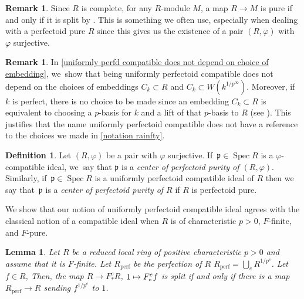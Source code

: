 \documentclass[JEP,XML,SOM,Unicode,published]{cedram}
\let\autoref\cref
\newcommand\mto{\mathchoice{\longmapsto}{\mapsto}{\mapsto}{\mapsto}}
\theoremstyle{plain}
\newtheorem{lemma}[theorem]{Lemma}
\theoremstyle{definition}
\newtheorem{definition}[theorem]{Definition}
\newtheorem{remark}[theorem]{Remark}
\numberwithin{equation}{theorem}
\newcommand{\p}{\mathfrak{p}}
\newcommand{\perf}{_{\mathrm{perf}}}
\DeclareMathOperator{\Spec}{{Spec}}
\newcommand{\unpe}{{1/{p^e}}}
\newcommand{\fe}{F^e}
\newcommand{\fstare}{\fe_*}
\renewcommand{\phi}{\varphi}
\newcommand{\rphi}{(R,\phi)}
\newcommand{\unpfty}{{1/p^\infty}}
\begin{document}
\begin{remark}
Since $R$ is complete, for any $R$\nobreakdash-module $M$, a map $R\to M$ is pure if and only if it is split by \cite[Lem.\,1.2]{FedderFPureRat}. This is something we often use, especially when dealing with a perfectoid pure $R$ since this gives us the existence of a pair $\rphi$ with $\phi$ surjective.
\end{remark}
\begin{remark}
In \autoref{uniformly perfd compatible does not depend on choice of embedding}, we~show that being uniformly perfectoid compatible does not depend on the choices of embeddings $C_k\subset R$ and $C_k\subset W(k^\unpfty)$. Moreover, if~$k$ is perfect, there is no choice to be made since an embedding $C_k\subset R$ is equivalent to choosing a $p$-basis for $k$ and a lift of that $p$-basis to $R$ (see \cite[Th.\,23]{HochsterStructureCompleteLocalRings}).
This justifies that the name uniformly perfectoid compatible does not have a reference to the choices we made in \autoref{notation rainfty}.
\end{remark}

\begin{definition}
Let $\rphi$ be a pair with $\phi$ surjective. If~$\p\in \Spec R$ is a $\phi$\nobreakdash-compatible ideal, we~say that $\p$ is a \emph{center of perfectoid purity of $\rphi$}.
Similarly, if~$\p\in \Spec R$ is a uniformly perfectoid compatible ideal of $R$ then we say that~$\p$ is a \emph{center of perfectoid purity of $R$} if $R$ is perfectoid pure.
\end{definition}

We show that our notion of uniformly perfectoid compatible ideal agrees with the classical notion of a compatible ideal when $R$ is of characteristic $p>0$, $F$-finite, and $F$-pure.
\begin{lemma}\label{lemma splitting from perfection}
Let $R$ be a reduced local ring of positive characteristic $p>0$ and assume that it is $F$-finite. Let $R\perf$ be the perfection of $R$ \ie $R\perf=\bigcup_e R^\unpe$. Let $f\in R$,
Then, the map $R\to\fstare R$, $1\mto \fstare f$
is split if and only if there is a map $R\perf\to R$ sending $f^\unpe$ to $1$.
\end{lemma}
\end{document}

